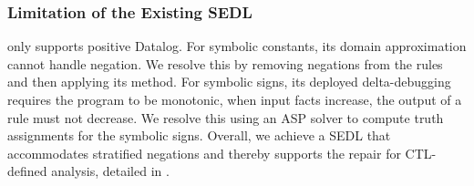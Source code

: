 \subsubsection{Limitation of the Existing SEDL}
\Symlog only supports positive Datalog. 
For symbolic constants, its domain approximation cannot handle negation.
We resolve this by removing negations from the rules and then applying its method.
For symbolic signs, its deployed delta-debugging requires the program to be monotonic, \ie when input facts increase, the output of a rule must not decrease. 
We resolve this using an ASP solver to compute truth assignments for the symbolic signs. 
Overall, we achieve a SEDL that accommodates stratified negations and thereby supports the repair for CTL-defined analysis, detailed in . 








